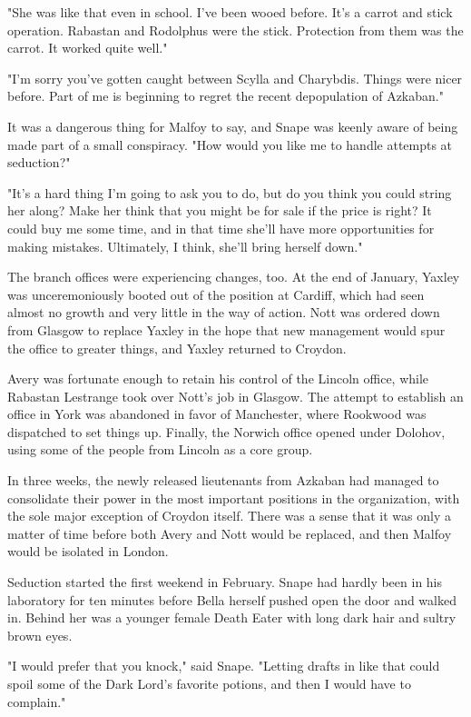 "She was like that even in school. I've been wooed before. It's a carrot and stick operation. Rabastan and Rodolphus were the stick. Protection from them was the carrot. It worked quite well."

"I'm sorry you've gotten caught between Scylla and Charybdis. Things were nicer before. Part of me is beginning to regret the recent depopulation of Azkaban."

It was a dangerous thing for Malfoy to say, and Snape was keenly aware of being made part of a small conspiracy. "How would you like me to handle attempts at seduction?"

"It's a hard thing I'm going to ask you to do, but do you think you could string her along? Make her think that you might be for sale if the price is right? It could buy me some time, and in that time she'll have more opportunities for making mistakes. Ultimately, I think, she'll bring herself down."

The branch offices were experiencing changes, too. At the end of January, Yaxley was unceremoniously booted out of the position at Cardiff, which had seen almost no growth and very little in the way of action. Nott was ordered down from Glasgow to replace Yaxley in the hope that new management would spur the office to greater things, and Yaxley returned to Croydon.

Avery was fortunate enough to retain his control of the Lincoln office, while Rabastan Lestrange took over Nott's job in Glasgow. The attempt to establish an office in York was abandoned in favor of Manchester, where Rookwood was dispatched to set things up. Finally, the Norwich office opened under Dolohov, using some of the people from Lincoln as a core group.

In three weeks, the newly released lieutenants from Azkaban had managed to consolidate their power in the most important positions in the organization, with the sole major exception of Croydon itself. There was a sense that it was only a matter of time before both Avery and Nott would be replaced, and then Malfoy would be isolated in London.

Seduction started the first weekend in February. Snape had hardly been in his laboratory for ten minutes before Bella herself pushed open the door and walked in. Behind her was a younger female Death Eater with long dark hair and sultry brown eyes.

"I would prefer that you knock," said Snape. "Letting drafts in like that could spoil some of the Dark Lord's favorite potions, and then I would have to complain."

